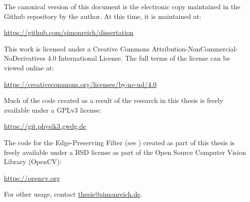 \newpage \thispagestyle{empty} \vspace*{\fill}
 
\noindent 

The canonical version of this document is the electronic copy maintained in the Github repository by the author. At this time, it is maintained at:\
\begin{center} \url{https://github.com/simonreich/dissertation} \\ \end{center}

\vspace{1cm}

This work is licensed under a Creative Commons Attribution-Non\-Com\-mer\-cial-No\-De\-ri\-va\-tives 4.0 International License. The full terms of the license can be viewed online at:\

\begin{center} \url{https://creativecommons.org/licenses/by-nc-nd/4.0} \\ \end{center}

\vspace{1cm}

Much of the code created as a result of the research in this thesis is freely available under a GPLv3 license:

\begin{center} \url{https://git.physik3.gwdg.de} \\ \end{center}

\vspace{1cm}

The code for the Edge-Preserving Filter (see ) created as part of this thesis is freely available under a BSD license as part of the Open Source Computer Vision Library (OpenCV):

\begin{center} \url{https://opencv.org} \\ \end{center}

\vspace{1cm}

\begin{center} For other usage, contact \url{thesis@simonreich.de}. \end{center}

\vfill

\begin{center}
\begin{textsc}
\copyright~\textit{\degreeyear \hspace{3pt}~- \author} \\ 
\noindent All rights reserved.
\end{textsc}
\end{center}
